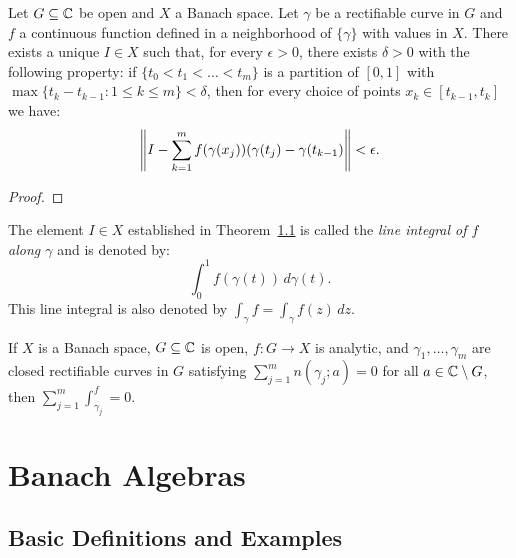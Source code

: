 \documentclass[reqno]{amsart}
\begin{document}
\begin{theorem}
	Let $G \subseteq \mathbb{C}$ be open and $X$ a Banach space. Let $\gamma$ be a rectifiable curve in $G$ and $f$ a continuous function defined in a neighborhood of $\{\gamma\}$ with values in $X$. There exists a unique $I \in X$ such that, for every $\epsilon > 0$, there exists $\delta > 0$ with the following property: if $\{t_0 < t_1 < \ldots < t_m\}$ is a partition of $[0,1]$ with $\max \{t_k - t_{k-1} : 1 \leq k \leq m\} < \delta$, then for every choice of points $x_k \in [t_{k-1},t_k]$ we have:
	\[
	\left\lVert I - \sum_{k=1}^{m} f(\gamma(x_j))(\gamma(t_j) - \gamma(t_{k-1}) \right\rVert < \epsilon.
	\] 
\end{theorem}
{\color{red}
\begin{proof}
		
\end{proof}}

\begin{definition}
	The element $I \in X$ established in Theorem~\ref{} is called the \emph{line integral of $f$ along $\gamma$} and is denoted by:
	\[
		\int_{0}^{1} f(\gamma(t))\,d\gamma(t).
	\] 
	This line integral is also denoted by $\int_{\gamma}^{} f = \int_{\gamma}^{} f(z)\,dz$.
\end{definition}



\begin{proposition}
	
\end{proposition}

\begin{proposition}
	
\end{proposition}

\begin{theorem}
	If $X$ is a Banach space, $G \subseteq \mathbb{C}$ is open, $f:G \rightarrow X$ is analytic, and $\gamma_1,\ldots ,\gamma_m$ are closed rectifiable curves in $G$ satisfying $\sum_{j=1}^{m} n(\gamma_j ; a) = 0$ for all $a \in \mathbb{C} \setminus G$, then $\sum_{j=1}^{m} \int_{\gamma_j}^{f} = 0 $.
\end{theorem}


\section{Banach Algebras}\label{Section:Banach Algebras}

\subsection{Basic Definitions and Examples}
\end{document}
